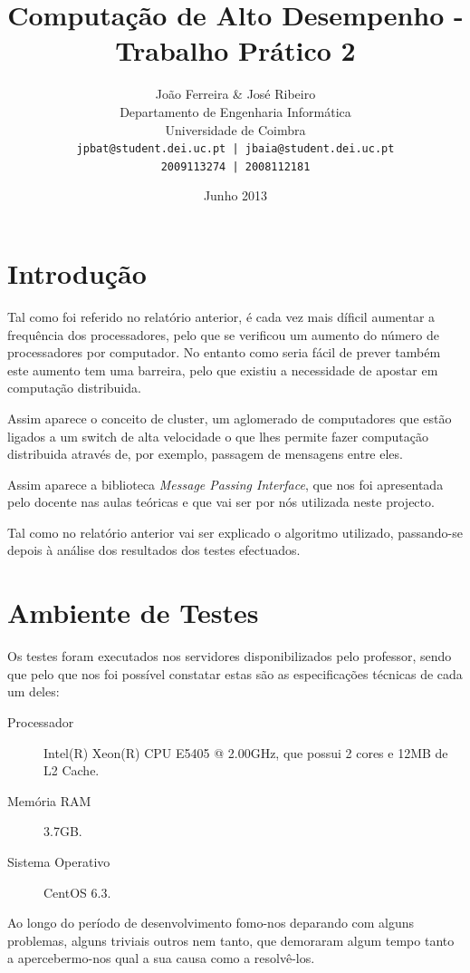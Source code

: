 \documentclass[a4paper]{article}
\title{Computação de Alto Desempenho - Trabalho Prático 2}
\author{João Ferreira \& José Ribeiro\\
		Departamento de Engenharia Informática\\
		Universidade de Coimbra\\
		\texttt{jpbat@student.dei.uc.pt | jbaia@student.dei.uc.pt}\\
		\texttt{2009113274 | 2008112181}}
\date{Junho 2013}
\begin{document}
\maketitle

\clearpage

\tableofcontents
\clearpage

\setlength{\parindent}{1cm}
\setlength{\parskip}{0.3cm}

\section{Introdução}
\indent \indent Tal como foi referido no relatório anterior, é cada vez mais díficil aumentar a frequência dos processadores, pelo que se verificou um aumento do número de processadores por computador. No entanto como seria fácil de prever também este aumento tem uma barreira, pelo que existiu a necessidade de apostar em computação distribuida.

Assim aparece o conceito de cluster, um aglomerado de computadores que estão ligados a um switch de alta velocidade o que lhes permite fazer computação distribuida através de, por exemplo, passagem de mensagens entre eles.

Assim aparece a biblioteca \textit{Message Passing Interface}, que nos foi apresentada pelo docente nas aulas teóricas e que vai ser por nós utilizada neste projecto.

Tal como no relatório anterior vai ser explicado o algoritmo utilizado, passando-se depois à análise dos resultados dos testes efectuados.
\clearpage


\section{Ambiente de Testes}
\indent \indent Os testes foram executados nos servidores disponibilizados pelo professor, sendo que pelo que nos foi possível constatar estas são as especificações técnicas de cada um deles:
\begin{description}
	\item [Processador] Intel(R) Xeon(R) CPU E5405 @ 2.00GHz, que possui 2 cores e 12MB de L2 Cache.
	\item [Memória RAM] 3.7GB.
	\item [Sistema Operativo] CentOS 6.3.
\end{description}

Ao longo do período de desenvolvimento fomo-nos deparando com alguns problemas, alguns triviais outros nem tanto, que demoraram algum tempo tanto a apercebermo-nos qual a sua causa como a resolvê-los.
\end{document}
